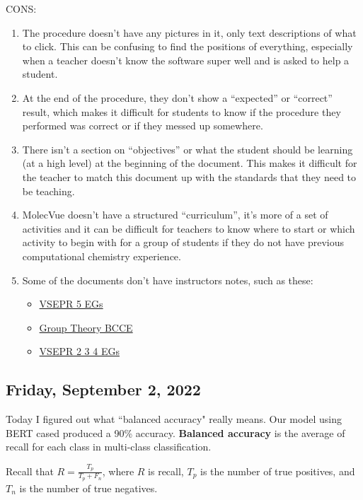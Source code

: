\documentclass[11pt,letterpaper]{article}
\begin{document}
CONS:
\begin{enumerate}
    \item The procedure doesn’t have any pictures in it, only text descriptions of what to click. This can be confusing to find the positions of everything, especially when a teacher doesn’t know the software super well and is asked to help a student.
    \item At the end of the procedure, they don’t show a “expected” or “correct” result, which makes it difficult for students to know if the procedure they performed was correct or if they messed up somewhere.
    \item There isn’t a section on “objectives” or what the student should be learning (at a high level) at the beginning of the document. This makes it difficult for the teacher to match this document up with the standards that they need to be teaching.
    \item MolecVue doesn’t have a structured “curriculum”, it’s more of a set of activities and it can be difficult for teachers to know where to start or which activity to begin with for a group of students if they do not have previous computational chemistry experience. 
    \item Some of the documents don’t have instructors notes, such as these:
    \begin{itemize}
        \item \href{https://drive.google.com/file/d/1F03piQqm2UlihIMhjv44DLJZ301NYJzz/view}{VSEPR 5 EGs}
        \item \href{https://drive.google.com/file/d/1nUpMCmk5g_n33nR2MTbBd722eFwnzuob/view}{Group Theory BCCE}
        \item \href{https://drive.google.com/file/d/124zYFVeFI3ZVwJVfoQpoWoudQMcn7dep/view}{VSEPR 2 3 4 EGs}
    \end{itemize}
\end{enumerate}

\subsection{Friday, September 2, 2022}
Today I figured out what ``balanced accuracy" really means. Our model using BERT cased produced a 90\% accuracy. \textbf{Balanced accuracy} is the average of recall for each class in multi-class classification.

Recall that $R = \frac{T_p}{T_p + F_n}$, where $R$ is recall, $T_p$ is the number of true positives, and $T_n$ is the number of true negatives.
\end{document}
